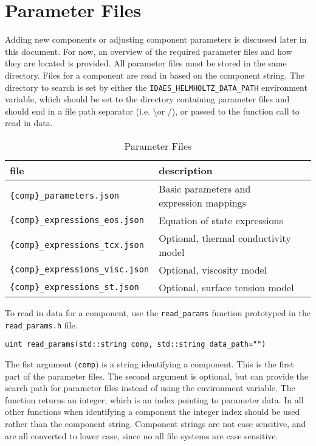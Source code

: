 \documentclass[oneside]{book}
\begin{document}
\section{Parameter Files}

Adding new components or adjusting component parameters is discussed later in this document.  For now, an overview of the required parameter files and how they are located is provided.  All parameter files must be stored in the same directory.  Files for a component are read in based on the component string.  The directory to search is set by either the \texttt{IDAES\_HELMHOLTZ\_DATA\_PATH} environment variable, which should be set to the directory containing parameter files and should end in a file path separator (i.e. \textbackslash \hspace{1ex}or /), or passed to the function call to read in data.  

\begin{table}[h!]
\centering
\caption{Parameter Files}
\begin{tabular}{ l l l }
\hline
file & description  \\
\hline
\hline
\texttt{\{comp\}\_parameters.json} &  Basic parameters and expression mappings\\ [1ex]
\texttt{\{comp\}\_expressions\_eos.json} &  Equation of state expressions \\ [1ex]
\texttt{\{comp\}\_expressions\_tcx.json} &  Optional, thermal conductivity model \\ [1ex]
\texttt{\{comp\}\_expressions\_visc.json} &  Optional, viscosity model \\ [1ex]
\texttt{\{comp\}\_expressions\_st.json} &  Optional, surface tension model \\ [1ex]
 \hline    
\end{tabular}
\label{table:parameter_files}
\end{table}

To read in data for a component, use the \texttt{read\_params} function prototyped in the \texttt{read\_params.h} file.

\begin{verbatim}
uint read_params(std::string comp, std::string data_path="")
\end{verbatim}

The fist argument (\texttt{comp}) is a string identifying a component.  This is the first part of the parameter files.  The second argument is optional, but can provide the search path for parameter files instead of using the environment variable.  The function returns an integer, which is an index pointing to parameter data.  In all other functions when identifying a component the integer index should be used rather than the component string.  Component strings are not case sensitive, and are all converted to lower case, since no all file systems are case sensitive. 
\end{document}
